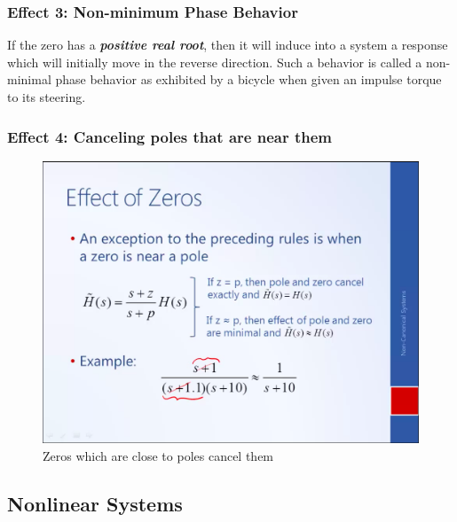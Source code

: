 \subsubsection{Effect 3: Non-minimum Phase Behavior}
If the zero has a \textbf{\textit{positive real root}}, then it will induce into a system a response which will initially move in the reverse direction. Such a behavior is called a non-minimal phase behavior as exhibited by a bicycle when given an impulse torque to its steering.
\subsubsection{Effect 4: Canceling poles that are near them}
\begin{figure}[h!]
	\centering
	\includegraphics[width=\linewidth]{Bilder/EffectOfZeros4}
	\caption{Zeros which are close to poles cancel them}
	\label{Fig_EffectOfZeros4}
\end{figure}
\clearpage

\subsection{Nonlinear Systems}

